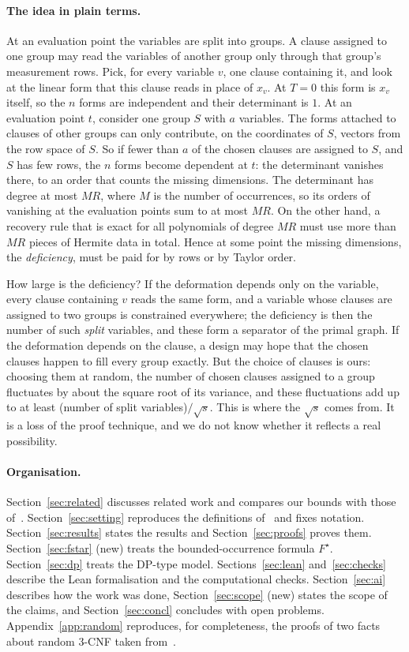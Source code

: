 \documentclass[11pt,a4paper]{article}
\theoremstyle{definition}
\theoremstyle{remark}
\begin{document}
\paragraph{The idea in plain terms.}
At an evaluation point the variables are split into groups. A clause assigned to one group
may read the variables of another group only through that group's measurement rows. Pick, for
every variable $v$, one clause containing it, and look at the linear form that this clause
reads in place of $x_v$. At $T=0$ this form is $x_v$ itself, so the $n$ forms are
independent and their determinant is $1$. At an evaluation point $t$, consider one group $S$
with $a$ variables. The forms attached to clauses of other groups can only contribute, on the
coordinates of $S$, vectors from the row space of $S$. So if fewer than $a$ of the chosen
clauses are assigned to $S$, and $S$ has few rows, the $n$ forms become dependent at $t$: the
determinant vanishes there, to an order that counts the missing dimensions. The determinant
has degree at most $MR$, where $M$ is the number of occurrences, so its orders of vanishing
at the evaluation points sum to at most $MR$. On the other hand, a recovery rule that is
exact for all polynomials of degree $MR$ must use more than $MR$ pieces of Hermite data in
total. Hence at some point the missing dimensions, the \emph{deficiency}, must be paid for
by rows or by Taylor order.

How large is the deficiency? If the deformation depends only on the variable, every clause
containing $v$ reads the same form, and a variable whose clauses are assigned to two groups
is constrained everywhere; the deficiency is then the number of such \emph{split} variables,
and these form a separator of the primal graph. If the deformation depends on the clause, a
design may hope that the chosen clauses happen to fill every group exactly. But the choice of
clauses is ours: choosing them at random, the number of chosen clauses assigned to a group
fluctuates by about the square root of its variance, and these fluctuations add up to at
least (number of split variables)$/\sqrt{s}$. This is where the $\sqrt s$ comes from. It is a
loss of the proof technique, and we do not know whether it reflects a real possibility.

\paragraph{Organisation.} Section~\ref{sec:related} discusses related work and compares our
bounds with those of~\cite{DL}. Section~\ref{sec:setting} reproduces the definitions
of~\cite{DL} and fixes notation. Section~\ref{sec:results} states the results and
Section~\ref{sec:proofs} proves them. Section~\ref{sec:fstar} (new) treats the
bounded-occurrence formula $F^\star$. Section~\ref{sec:dp} treats the DP-type model.
Sections~\ref{sec:lean} and~\ref{sec:checks} describe the Lean formalisation and the
computational checks. Section~\ref{sec:ai} describes how the work was done,
Section~\ref{sec:scope} (new) states the scope of the claims, and
Section~\ref{sec:concl} concludes with open problems. Appendix~\ref{app:random} reproduces,
for completeness, the proofs of two facts about random 3-CNF taken from~\cite{DL}.
\end{document}
